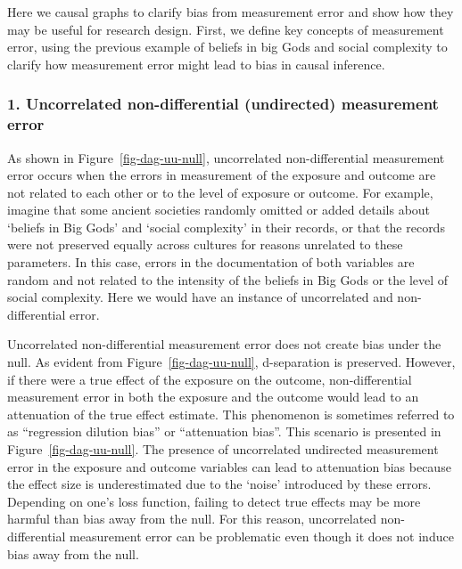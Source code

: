\documentclass[
  singlecolumn]{report}
\begin{document}
Here we causal graphs to clarify bias from measurement error and show
how they may be useful for research design. First, we define key
concepts of measurement error, using the previous example of beliefs in
big Gods and social complexity to clarify how measurement error might
lead to bias in causal inference.

\hypertarget{uncorrelated-non-differential-undirected-measurement-error}{%
\subsubsection{\texorpdfstring{1. \textbf{Uncorrelated non-differential
(undirected) measurement
error}}{1. Uncorrelated non-differential (undirected) measurement error}}\label{uncorrelated-non-differential-undirected-measurement-error}}

As shown in Figure~\ref{fig-dag-uu-null}, uncorrelated non-differential
measurement error occurs when the errors in measurement of the exposure
and outcome are not related to each other or to the level of exposure or
outcome. For example, imagine that some ancient societies randomly
omitted or added details about `beliefs in Big Gods' and `social
complexity' in their records, or that the records were not preserved
equally across cultures for reasons unrelated to these parameters. In
this case, errors in the documentation of both variables are random and
not related to the intensity of the beliefs in Big Gods or the level of
social complexity. Here we would have an instance of uncorrelated and
non-differential error.

Uncorrelated non-differential measurement error does not create bias
under the null. As evident from Figure~\ref{fig-dag-uu-null},
d-separation is preserved. However, if there were a true effect of the
exposure on the outcome, non-differential measurement error in both the
exposure and the outcome would lead to an attenuation of the true effect
estimate. This phenomenon is sometimes referred to as ``regression
dilution bias'' or ``attenuation bias''. This scenario is presented in
Figure~\ref{fig-dag-uu-null}. The presence of uncorrelated undirected
measurement error in the exposure and outcome variables can lead to
attenuation bias because the effect size is underestimated due to the
`noise' introduced by these errors. Depending on one's loss function,
failing to detect true effects may be more harmful than bias away from
the null. For this reason, uncorrelated non-differential measurement
error can be problematic even though it does not induce bias away from
the null.
\end{document}
